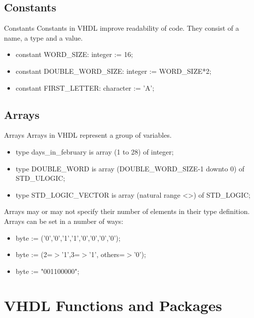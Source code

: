\subsection{Constants}

\begin{frame}{Constants}
  Constants in VHDL improve readability of code.  They consist of a name, a type and a value.
  \begin{itemize}
    \item constant WORD\_SIZE: integer := 16;
    \item constant DOUBLE\_WORD\_SIZE: integer := WORD\_SIZE*2;
    \item constant FIRST\_LETTER: character := 'A';
  \end{itemize}
\end{frame}

\subsection{Arrays}

\begin{frame}{Arrays}
  Arrays in VHDL represent a group of variables.
  \begin{itemize}
    \item type days\_in\_february is array (1 to 28) of integer;
    \item type DOUBLE\_WORD is array (DOUBLE\_WORD\_SIZE-1 downto 0) of STD\_ULOGIC;
    \item type STD\_LOGIC\_VECTOR is array (natural range <>) of STD\_LOGIC;
  \end{itemize}
  Arrays may or may not specify their number of elements in their type definition.\\
  Arrays can be set in a number of ways:
  \begin{itemize}
    \item byte := ('0','0','1','1','0','0','0','0');
    \item byte := (2=$>$'1',3=$>$'1', others=$>$'0');
    \item byte := "001100000";
  \end{itemize}
\end{frame}

\section{VHDL Functions and Packages}

